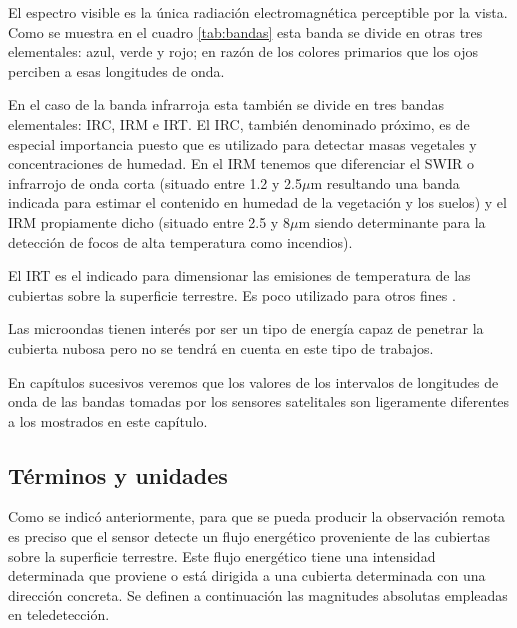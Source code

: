El espectro visible es la única radiación electromagnética perceptible por la vista. Como se muestra en el cuadro \ref{tab:bandas} esta banda se divide en otras tres elementales: azul, verde y rojo; en razón de los colores primarios que los ojos perciben a esas longitudes de onda.%

En el caso de la banda infrarroja esta también se divide en tres bandas elementales: \ac{IRC}, \ac{IRM} e \ac{IRT}. El \ac{IRC}, también denominado próximo, es de especial importancia puesto que es utilizado para detectar masas vegetales y concentraciones de humedad. En el \ac{IRM} tenemos que diferenciar el \ac{SWIR} o infrarrojo de onda corta (situado entre 1.2 y 2.5$\mu$m resultando una banda indicada para estimar el contenido en humedad de la vegetación y los suelos) y el \ac{IRM} propiamente dicho (situado entre 2.5 y 8$\mu$m siendo determinante para la detección de focos de alta temperatura como incendios).%

El \ac{IRT} es el indicado para dimensionar las emisiones de temperatura de las cubiertas sobre la superficie terrestre. Es poco utilizado para otros fines \citep{chuvieco2002teledeteccion}.%

Las microondas tienen interés por ser un tipo de energía capaz de penetrar la cubierta nubosa pero no se tendrá en cuenta en este tipo de trabajos.%

En capítulos sucesivos veremos que los valores de los intervalos de longitudes de onda de las bandas tomadas por los sensores satelitales son ligeramente diferentes a los mostrados en este capítulo.

\subsection{Términos y unidades}
Como se indicó anteriormente, para que se pueda producir la observación remota es preciso que el sensor detecte un flujo energético proveniente de las cubiertas sobre la superficie terrestre. Este flujo energético tiene una intensidad determinada que proviene o está dirigida a una cubierta determinada con una dirección concreta. Se definen a continuación las magnitudes absolutas empleadas en teledetección.

